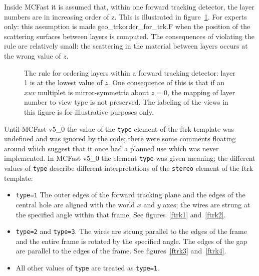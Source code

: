 \filbreak
Inside MCFast it is assumed that, within one forward tracking detector,
the layer numbers are in increasing order of z.  
This is illustrated in figure~\ref{ftrk5}.  For experts only:
this assumption is made geo\_trkorder\_for\_trk.F when the position 
of the scattering surfaces between layers is computed.  The consequences
of violating the rule are relatively small: the scattering in the material
between layers occurs at the wrong value of $z$.
\begin{figure} [tbp]
\centerline{\epsfysize=1.5in }
\caption{\label{ftrk5}  The rule for ordering layers within a 
forward tracking detector: layer 1 is at the lowest value of
$z$.  One consequence of this is that if an $xuv$ multiplet
is mirror-symmetric about $z=0$, the mapping of layer number
to view type is not preserved.  The labeling of the views in this figure
is for illustrative purposes only.  }
\end{figure}

Until MCFast v5\_0 the value of the {\tt type} element of
the ftrk template was undefined and was ignored by the code; there 
were some comments floating around which suggest that it once had
a planned use which was never implemented.
In MCFast v5\_0 the element {\tt type} was given
meaning; the different values of {\tt type} describe different
interpretations of the {\tt stereo} element of the ftrk template:
\begin{itemize}
\item {\tt type=1} The outer edges of the forward tracking plane and the
                   edges of the central hole are aligned
                   with the world $x$ and $y$ axes; the wires 
                   are strung at the specified angle within that frame.
                   See figures~\ref{ftrk1} and~\ref{ftrk2}. 
\item {\tt type=2} and {\tt type=3}. 
                   The wires are strung parallel to the edges of the
                   frame and the entire frame is rotated by the
                   specified angle.  The edges of the gap are parallel
                   to the edges of the frame.  See figures~\ref{ftrk3} 
                   and~\ref{ftrk4}.
\item All other values of {\tt type} are treated as {\tt type=1}.
\end{itemize}

